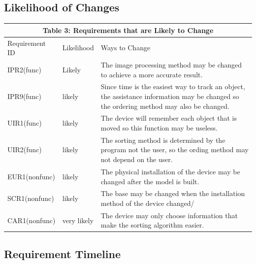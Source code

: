 \documentclass[12pt]{article}
\begin{document}
\subsection{Likelihood of Changes}

\begin{tabular}{|p{}|p{}|p{}|}

\hline \multicolumn{3}{|c|}{Table 3: Requirements that are Likely to Change}\\

\hline Requirement ID&Likelihood&Ways to Change\\

\hline IPR2(func)&Likely&The image processing method may be changed to achieve a more accurate result.\\

\hline IPR9(func)&likely&Since time is the easiest way to track an object, the assistance information may be changed so the ordering method may also be changed.\\

\hline UIR1(func)&likely&The device will remember each object that is moved so this function may be useless.\\

\hline UIR2(func)&likely&The sorting method is determined by the program not the user, so the ording method may not depend on the user. \\

\hline EUR1(nonfunc)&likely&The physical installation of the device may be changed after the model is built.\\

\hline SCR1(nonfunc)&likely&The base may be changed when the installation method of the device changed/\\

\hline CAR1(nonfunc)&very likely&The device may only choose information that make the sorting algorithm easier.\\

\hline

\end{tabular}

\subsection{Requirement Timeline}
\end{document}

